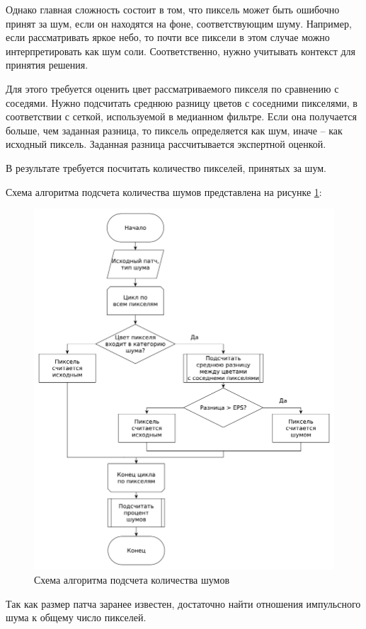 Однако главная сложность состоит в том, что пиксель может быть ошибочно принят за шум, если он находятся на фоне, соответствующим шуму.
Например, если рассматривать яркое небо, то почти все пиксели в этом случае можно интерпретировать как шум соли.
Соответственно, нужно учитывать контекст для принятия решения.

Для этого требуется оценить цвет рассматриваемого пикселя по сравнению с соседями.
Нужно подсчитать среднюю разницу цветов с соседними пикселями, в соответствии с сеткой, используемой в медианном фильтре.
Если она получается больше, чем заданная разница, то пиксель определяется как шум, иначе -- как исходный пиксель.
Заданная разница рассчитывается экспертной оценкой.

В результате требуется посчитать количество пикселей, принятых за шум. 

\newpage
Схема алгоритма подсчета количества шумов представлена на рисунке \ref{contruct::count}:
\FloatBarrier
\begin{figure}[h!]	
	\begin{center}
		\includegraphics[width=\linewidth]{inc/pdf/shumCount.pdf}
	\end{center}
	\captionsetup{justification=centering}
	\caption{Схема алгоритма подсчета количества шумов}
	\label{contruct::count}
\end{figure}
\FloatBarrier
Так как размер патча заранее известен, достаточно найти отношения импульсного шума к общему число пикселей.

